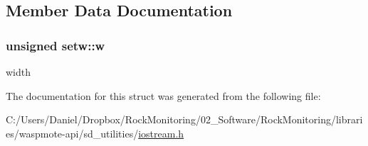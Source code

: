 \subsection{Member Data Documentation}
\subsubsection[{\texorpdfstring{w}{w}}]{\setlength{\rightskip}{0pt plus 5cm}unsigned setw\+::w}\hypertarget{structsetw_ab48d915a24d3f3365c9eb76e138a6f4e}{}\label{structsetw_ab48d915a24d3f3365c9eb76e138a6f4e}
width 

The documentation for this struct was generated from the following file\+:\begin{DoxyCompactItemize}
\item 
C\+:/\+Users/\+Daniel/\+Dropbox/\+Rock\+Monitoring/02\+\_\+\+Software/\+Rock\+Monitoring/libraries/waspmote-\/api/sd\+\_\+utilities/\hyperlink{iostream_8h}{iostream.\+h}\end{DoxyCompactItemize}
